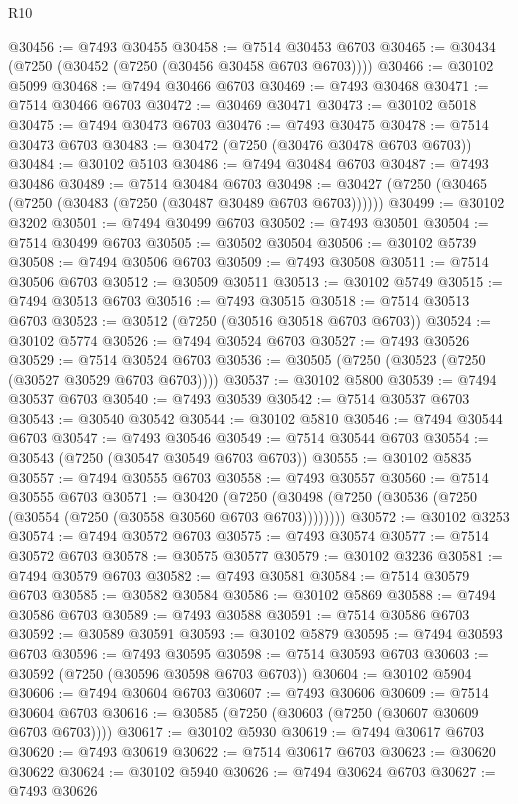 \begin{lexlean}{R10}
\begin{coremodule}
@30456 := @7493 @30455
@30458 := @7514 @30453 @6703
@30465 := @30434 (@7250 (@30452 (@7250 (@30456 @30458 @6703 @6703))))
@30466 := @30102 @5099
@30468 := @7494 @30466 @6703
@30469 := @7493 @30468
@30471 := @7514 @30466 @6703
@30472 := @30469 @30471
@30473 := @30102 @5018
@30475 := @7494 @30473 @6703
@30476 := @7493 @30475
@30478 := @7514 @30473 @6703
@30483 := @30472 (@7250 (@30476 @30478 @6703 @6703))
@30484 := @30102 @5103
@30486 := @7494 @30484 @6703
@30487 := @7493 @30486
@30489 := @7514 @30484 @6703
@30498 := @30427 (@7250 (@30465 (@7250 (@30483 (@7250 (@30487 @30489 @6703 @6703))))))
@30499 := @30102 @3202
@30501 := @7494 @30499 @6703
@30502 := @7493 @30501
@30504 := @7514 @30499 @6703
@30505 := @30502 @30504
@30506 := @30102 @5739
@30508 := @7494 @30506 @6703
@30509 := @7493 @30508
@30511 := @7514 @30506 @6703
@30512 := @30509 @30511
@30513 := @30102 @5749
@30515 := @7494 @30513 @6703
@30516 := @7493 @30515
@30518 := @7514 @30513 @6703
@30523 := @30512 (@7250 (@30516 @30518 @6703 @6703))
@30524 := @30102 @5774
@30526 := @7494 @30524 @6703
@30527 := @7493 @30526
@30529 := @7514 @30524 @6703
@30536 := @30505 (@7250 (@30523 (@7250 (@30527 @30529 @6703 @6703))))
@30537 := @30102 @5800
@30539 := @7494 @30537 @6703
@30540 := @7493 @30539
@30542 := @7514 @30537 @6703
@30543 := @30540 @30542
@30544 := @30102 @5810
@30546 := @7494 @30544 @6703
@30547 := @7493 @30546
@30549 := @7514 @30544 @6703
@30554 := @30543 (@7250 (@30547 @30549 @6703 @6703))
@30555 := @30102 @5835
@30557 := @7494 @30555 @6703
@30558 := @7493 @30557
@30560 := @7514 @30555 @6703
@30571 := @30420
    (@7250 (@30498 (@7250 (@30536 (@7250 (@30554 (@7250 (@30558 @30560 @6703 @6703))))))))
@30572 := @30102 @3253
@30574 := @7494 @30572 @6703
@30575 := @7493 @30574
@30577 := @7514 @30572 @6703
@30578 := @30575 @30577
@30579 := @30102 @3236
@30581 := @7494 @30579 @6703
@30582 := @7493 @30581
@30584 := @7514 @30579 @6703
@30585 := @30582 @30584
@30586 := @30102 @5869
@30588 := @7494 @30586 @6703
@30589 := @7493 @30588
@30591 := @7514 @30586 @6703
@30592 := @30589 @30591
@30593 := @30102 @5879
@30595 := @7494 @30593 @6703
@30596 := @7493 @30595
@30598 := @7514 @30593 @6703
@30603 := @30592 (@7250 (@30596 @30598 @6703 @6703))
@30604 := @30102 @5904
@30606 := @7494 @30604 @6703
@30607 := @7493 @30606
@30609 := @7514 @30604 @6703
@30616 := @30585 (@7250 (@30603 (@7250 (@30607 @30609 @6703 @6703))))
@30617 := @30102 @5930
@30619 := @7494 @30617 @6703
@30620 := @7493 @30619
@30622 := @7514 @30617 @6703
@30623 := @30620 @30622
@30624 := @30102 @5940
@30626 := @7494 @30624 @6703
@30627 := @7493 @30626

\end{coremodule}
\end{lexlean}
